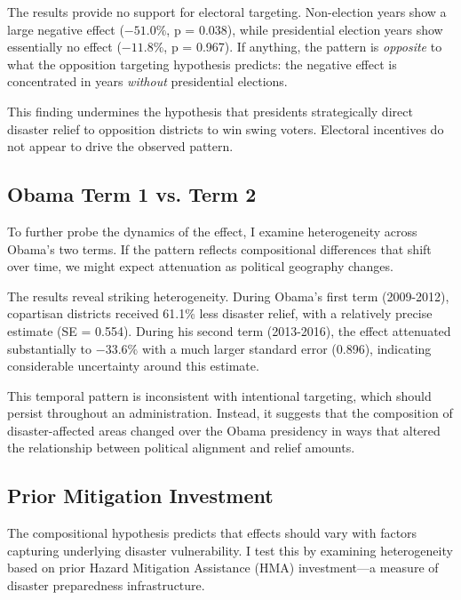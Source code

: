 \documentclass[12pt,letterpaper,oneside]{book}
\newcommand{\basepath}{g:/My Drive/Grad School}
\newcommand{\basepath}{basepath}
\begin{document}


The results provide no support for electoral targeting. Non-election years show a large negative effect ($-51.0\%$, p = 0.038), while presidential election years show essentially no effect ($-11.8\%$, p = 0.967). If anything, the pattern is \emph{opposite} to what the opposition targeting hypothesis predicts: the negative effect is concentrated in years \emph{without} presidential elections.

This finding undermines the hypothesis that presidents strategically direct disaster relief to opposition districts to win swing voters. Electoral incentives do not appear to drive the observed pattern.

\subsection{Obama Term 1 vs. Term 2}

To further probe the dynamics of the effect, I examine heterogeneity across Obama's two terms. If the pattern reflects compositional differences that shift over time, we might expect attenuation as political geography changes.



The results reveal striking heterogeneity. During Obama's first term (2009-2012), copartisan districts received 61.1\% less disaster relief, with a relatively precise estimate (SE = 0.554). During his second term (2013-2016), the effect attenuated substantially to $-33.6\%$ with a much larger standard error (0.896), indicating considerable uncertainty around this estimate.

This temporal pattern is inconsistent with intentional targeting, which should persist throughout an administration. Instead, it suggests that the composition of disaster-affected areas changed over the Obama presidency in ways that altered the relationship between political alignment and relief amounts.

\subsection{Prior Mitigation Investment}

The compositional hypothesis predicts that effects should vary with factors capturing underlying disaster vulnerability. I test this by examining heterogeneity based on prior Hazard Mitigation Assistance (HMA) investment---a measure of disaster preparedness infrastructure.
\end{document}
